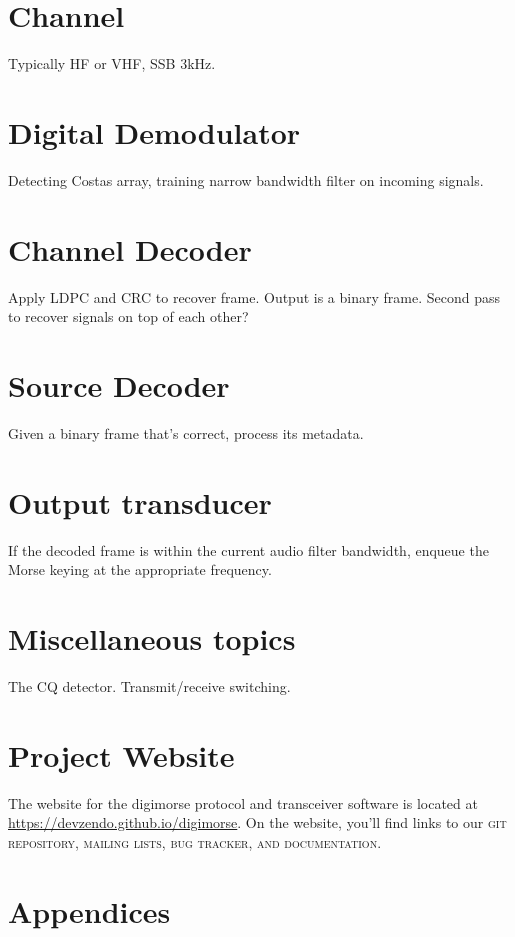 \documentclass[a4paper]{tufte-handout}
\newcommand{\textls}[2][5]{%
    \begingroup\addfontfeatures{LetterSpace=#1}#2\endgroup
  }
\renewcommand{\smallcapsspacing}[1]{\textls[10]{#1}}
\renewcommand{\smallcaps}[1]{\smallcapsspacing{\scshape\MakeTextLowercase{#1}}}
\begin{document}
\section{Channel}
Typically HF or VHF, SSB 3kHz.

\section{Digital Demodulator}
Detecting Costas array, training narrow bandwidth filter on incoming signals. 

\section{Channel Decoder}
Apply LDPC and CRC to recover frame. Output is a binary frame.
Second pass to recover signals on top of each other?

\section{Source Decoder}
Given a binary frame that's correct, process its metadata.

\section{Output transducer}
If the decoded frame is within the current audio filter bandwidth, enqueue the Morse keying at the appropriate frequency.

\section{Miscellaneous topics}
The CQ detector. Transmit/receive switching.

\pagebreak
\section{Project Website}

The website for the digimorse protocol and transceiver software is located at
\url{https://devzendo.github.io/digimorse}. On the website, you'll find
links to our \smallcaps{git} repository, mailing lists, bug tracker, and documentation.

\pagebreak
\appendix
\section*{Appendices}
\renewcommand{\thesubsection}{\Alph{subsection}}
\end{document}
